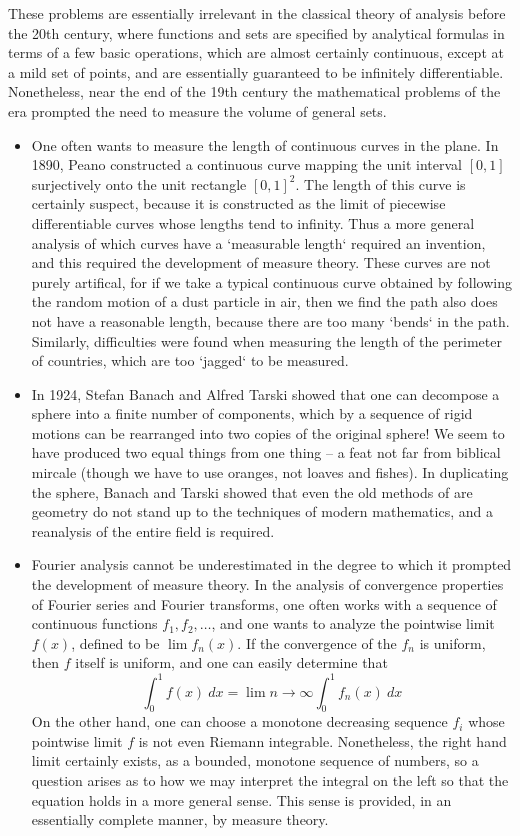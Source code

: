 These problems are essentially irrelevant in the classical theory of analysis before the 20th century, where functions and sets are specified by analytical formulas in terms of a few basic operations, which are almost certainly continuous, except at a mild set of points, and are essentially guaranteed to be infinitely differentiable. Nonetheless, near the end of the 19th century the mathematical problems of the era prompted the need to measure the volume of general sets.
%
\begin{itemize}
  \item One often wants to measure the length of continuous curves in the plane. In 1890, Peano constructed a continuous curve mapping the unit interval $[0,1]$ surjectively onto the unit rectangle $[0,1]^2$. The length of this curve is certainly suspect, because it is constructed as the limit of piecewise differentiable curves whose lengths tend to infinity. Thus a more general analysis of which curves have a `measurable length` required an invention, and this required the development of measure theory. These curves are not purely artifical, for if we take a typical continuous curve obtained by following the random motion of a dust particle in air, then we find the path also does not have a reasonable length, because there are too many `bends` in the path. Similarly, difficulties were found when measuring the length of the perimeter of countries, which are too `jagged` to be measured.

  \item In 1924, Stefan Banach and Alfred Tarski showed that one can decompose a sphere into a finite number of components, which by a sequence of rigid motions can be rearranged into two copies of the original sphere! We seem to have produced two equal things from one thing -- a feat not far from biblical mircale (though we have to use oranges, not loaves and fishes). In duplicating the sphere, Banach and Tarski showed that even the old methods of are geometry do not stand up to the techniques of modern mathematics, and a reanalysis of the entire field is required.

  \item Fourier analysis cannot be underestimated in the degree to which it prompted the development of measure theory. In the analysis of convergence properties of Fourier series and Fourier transforms, one often works with a sequence of continuous functions $f_1, f_2, \dots$, and one wants to analyze the pointwise limit $f(x)$, defined to be $\lim f_n(x)$. If the convergence of the $f_n$ is uniform, then $f$ itself is uniform, and one can easily determine that
  \[ \int_0^1 f(x)\ dx = \lim{n \to \infty} \int_0^1 f_n(x)\ dx \]
  On the other hand, one can choose a monotone decreasing sequence $f_i$ whose pointwise limit $f$ is not even Riemann integrable. Nonetheless, the right hand limit certainly exists, as a bounded, monotone sequence of numbers, so a question arises as to how we may interpret the integral on the left so that the equation holds in a more general sense. This sense is provided, in an essentially complete manner, by measure theory.
\end{itemize}
